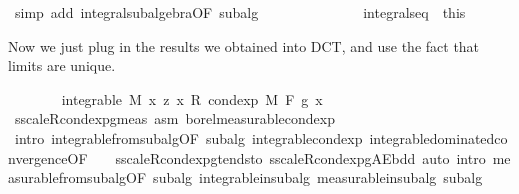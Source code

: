\begin{isabellebody}
\ {\isacharparenleft}{\kern0pt}simp\ add{\isacharcolon}{\kern0pt}\ integral{\isacharunderscore}{\kern0pt}subalgebra{}{\isacharbrackleft}{\kern0pt}OF\ subalg{\isacharbrackright}{\kern0pt}{\isacharparenright}{\kern0pt}\isanewline
\ \ \ \ \ \ \isacommand{{\isacharbraceright}{\kern0pt}}\isamarkupfalse%
\isanewline
\ \ \ \ \ \ \isamarkupfalse%
\ integral{\isacharunderscore}{\kern0pt}s{\isacharunderscore}{\kern0pt}eq\ {\isacharequal}{\kern0pt}\ this%
\begin{isamarkuptext}%
Now we just plug in the results we obtained into DCT, and use the fact that limits are unique.%
\end{isamarkuptext}\isamarkuptrue%
\ \ \ \ \ \ \isamarkupfalse%
\ {\isachardoublequoteopen}integrable\ M\ {\isacharparenleft}{\kern0pt}{\isasymlambda}x{\isachardot}{\kern0pt}\ z\ x\ {\isacharasterisk}{\kern0pt}\isactrlsub R\ cond{\isacharunderscore}{\kern0pt}exp\ M\ F\ g\ x{\isacharparenright}{\kern0pt}{\isachardoublequoteclose}\ \isamarkupfalse%
\ s{\isacharunderscore}{\kern0pt}scaleR{\isacharunderscore}{\kern0pt}cond{\isacharunderscore}{\kern0pt}exp{\isacharunderscore}{\kern0pt}g{\isacharunderscore}{\kern0pt}meas\ asm{\isacharparenleft}{\kern0pt}{}{\isacharparenright}{\kern0pt}\ borel{\isacharunderscore}{\kern0pt}measurable{\isacharunderscore}{\kern0pt}cond{\isacharunderscore}{\kern0pt}exp{\isacharprime}{\kern0pt}\ \isamarkupfalse%
\ {\isacharparenleft}{\kern0pt}intro\ integrable{\isacharunderscore}{\kern0pt}from{\isacharunderscore}{\kern0pt}subalg{\isacharbrackleft}{\kern0pt}OF\ subalg{\isacharbrackright}{\kern0pt}\ integrable{\isacharunderscore}{\kern0pt}cond{\isacharunderscore}{\kern0pt}exp\ integrable{\isacharunderscore}{\kern0pt}dominated{\isacharunderscore}{\kern0pt}convergence{\isacharbrackleft}{\kern0pt}OF\ {\isacharunderscore}{\kern0pt}\ {\isacharunderscore}{\kern0pt}\ {\isacharunderscore}{\kern0pt}\ s{\isacharunderscore}{\kern0pt}scaleR{\isacharunderscore}{\kern0pt}cond{\isacharunderscore}{\kern0pt}exp{\isacharunderscore}{\kern0pt}g{\isacharunderscore}{\kern0pt}tendsto\ s{\isacharunderscore}{\kern0pt}scaleR{\isacharunderscore}{\kern0pt}cond{\isacharunderscore}{\kern0pt}exp{\isacharunderscore}{\kern0pt}g{\isacharunderscore}{\kern0pt}AE{\isacharunderscore}{\kern0pt}bdd{\isacharbrackright}{\kern0pt}{\isacharparenright}{\kern0pt}\ {\isacharparenleft}{\kern0pt}auto\ intro{\isacharcolon}{\kern0pt}\ measurable{\isacharunderscore}{\kern0pt}from{\isacharunderscore}{\kern0pt}subalg{\isacharbrackleft}{\kern0pt}OF\ subalg{\isacharbrackright}{\kern0pt}\ integrable{\isacharunderscore}{\kern0pt}in{\isacharunderscore}{\kern0pt}subalg\ measurable{\isacharunderscore}{\kern0pt}in{\isacharunderscore}{\kern0pt}subalg\ subalg{\isacharparenright}{\kern0pt}\isanewline

\end{isabellebody}
